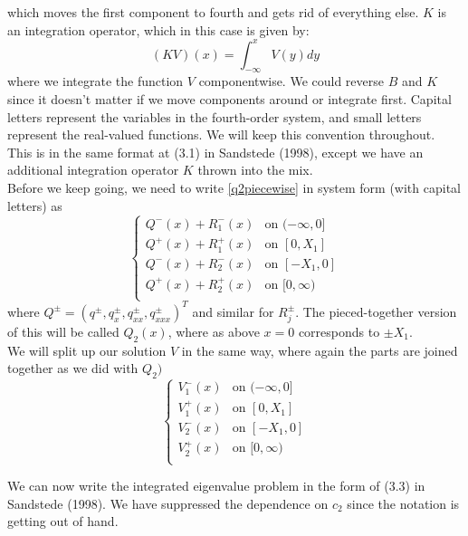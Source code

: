 \documentclass[12pt]{article}
\begin{document}
which moves the first component to fourth and gets rid of everything else. $K$ is an integration operator, which in this case is given by:
\[
(KV)(x) = \int_{-\infty}^x V(y) dy
\]
where we integrate the function $V$ componentwise. We could reverse $B$ and $K$ since it doesn't matter if we move components around or integrate first. Capital letters represent the variables in the fourth-order system, and small letters represent the real-valued functions. We will keep this convention throughout. This is in the same format at (3.1) in Sandstede (1998), except we have an additional integration operator $K$ thrown into the mix.\\

Before we keep going, we need to write \eqref{q2piecewise} in system form (with capital letters) as
\begin{equation}\label{q2piecewisesystem}
\begin{cases}
Q^-(x) + R_1^-(x) & \text{on } (-\infty, 0] \\
Q^+(x) + R_1^+(x) & \text{on } [0, X_1] \\
Q^-(x) + R_2^-(x) & \text{on } [-X_1, 0] \\
Q^+(x) + R_2^+(x) & \text{on } [0, \infty) \\ 
\end{cases}
\end{equation}
where $Q^\pm = (q^\pm, q^\pm_x, q^\pm_{xx}, q^\pm_{xxx})^T$ and similar for $R_j^\pm$. The pieced-together version of this will be called $Q_2(x)$, where as above $x = 0$ corresponds to $\pm X_1$.\\


We will split up our solution $V$ in the same way, where again the parts are joined together as we did with $Q_2)$
\begin{equation}
\begin{cases}
V_1^-(x) & \text{on } (-\infty, 0] \\
V_1^+(x) & \text{on } [0, X_1] \\
V_2^-(x) & \text{on } [-X_1, 0] \\
V_2^+(x) & \text{on } [0, \infty) \\ 
\end{cases}
\end{equation}

We can now write the integrated eigenvalue problem in the form of (3.3) in Sandstede (1998). We have suppressed the dependence on $c_2$ since the notation is getting out of hand.
\end{document}
